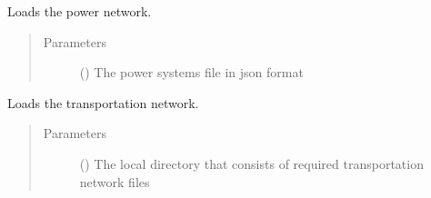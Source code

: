 \documentclass[letterpaper,10pt,english]{sphinxmanual}
\begin{document}
\begin{fulllineitems}
\begin{fulllineitems}
\end{fulllineitems}


\begin{fulllineitems}
\label{\detokenize{apidoc:dreaminsg_integrated_model.src.network_sim_models.integrated_network.IntegratedNetwork.load_power_network}}
\sphinxAtStartPar
Loads the power network.
\begin{quote}\begin{description}
\item[{Parameters}] \leavevmode
\sphinxAtStartPar
{} () \textendash{} The power systems file in json format

\end{description}\end{quote}

\end{fulllineitems}


\begin{fulllineitems}
\label{\detokenize{apidoc:dreaminsg_integrated_model.src.network_sim_models.integrated_network.IntegratedNetwork.load_transpo_network}}
\sphinxAtStartPar
Loads the transportation network.
\begin{quote}\begin{description}
\item[{Parameters}] \leavevmode
\sphinxAtStartPar
{} () \textendash{} The local directory that consists of required transportation network files

\end{description}\end{quote}

\end{fulllineitems}



\end{fulllineitems}
\end{document}
